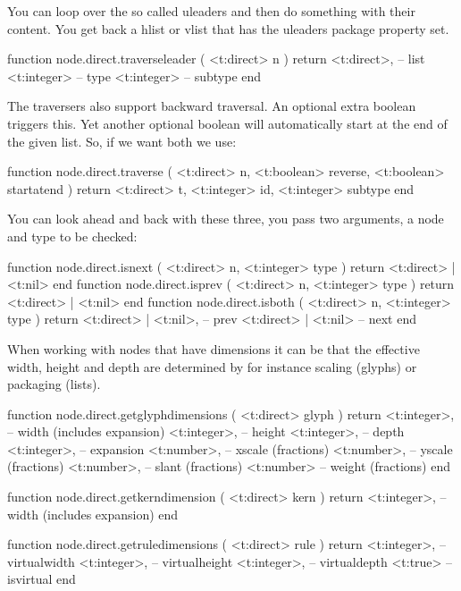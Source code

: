 You can loop over the so called uleaders and then do something with their
content. You get back a hlist or vlist that has the uleaders package property
set.

\starttyping[option=LUA]
function node.direct.traverseleader ( <t:direct> n )
    return
        <t:direct>, -- list
        <t:integer> -- type
        <t:integer> -- subtype
end
\stoptyping

The traversers also support backward traversal. An optional extra boolean triggers
this. Yet another optional boolean will automatically start at the end of the
given list. So, if we want both we use:

\starttyping[option=LUA]
function node.direct.traverse (
    <t:direct>  n,
    <t:boolean> reverse,
    <t:boolean> startatend
)
    return
        <t:direct>  t,
        <t:integer> id,
        <t:integer> subtype
end
\stoptyping

You can look ahead and back with these three, you pass two arguments, a node and
type to be checked:

\starttyping[option=LUA]
function node.direct.isnext ( <t:direct> n, <t:integer> type )
    return <t:direct> | <t:nil>
end
function node.direct.isprev ( <t:direct> n, <t:integer> type )
    return <t:direct> | <t:nil>
end
function node.direct.isboth ( <t:direct> n, <t:integer> type )
    return
        <t:direct> | <t:nil>, -- prev
        <t:direct> | <t:nil>  -- next
end
\stoptyping

\stopsubsection

\startsubsection[title=Dimensions]

When working with nodes that have dimensions it can be that the effective
width, height and depth are determined by for instance scaling (glyphs) or
packaging (lists).

\starttyping[option=LUA]
function node.direct.getglyphdimensions ( <t:direct> glyph )
    return
        <t:integer>, -- width  (includes expansion)
        <t:integer>, -- height
        <t:integer>, -- depth
        <t:integer>, -- expansion
        <t:number>,  -- xscale (fractions)
        <t:number>,  -- yscale (fractions)
        <t:number>,  -- slant  (fractions)
        <t:number>   -- weight (fractions)
end
\stoptyping

\starttyping[option=LUA]
function node.direct.getkerndimension ( <t:direct> kern )
    return <t:integer>, -- width (includes expansion)
end
\stoptyping

\starttyping[option=LUA]
function node.direct.getruledimensions ( <t:direct> rule )
    return
        <t:integer>, -- virtualwidth
        <t:integer>, -- virtualheight
        <t:integer>, -- virtualdepth
        <t:true>     -- isvirtual
end

